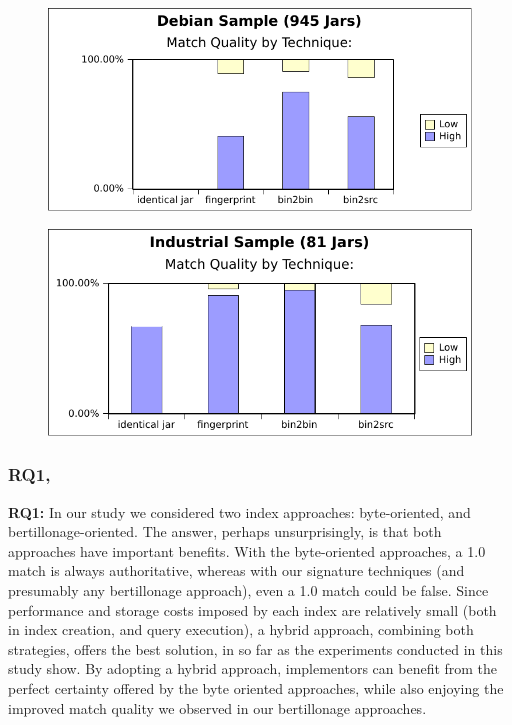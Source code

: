 \begin{figure}[ht]
\begin{minipage}[b]{0.5\linewidth}
\centering
\includegraphics[width=\columnwidth]{plots/debianMatchQuality.pdf}
\label{fig:debianMatchQual}
\end{minipage}
\hspace{0.5cm}
\begin{minipage}[b]{0.5\linewidth}
\centering
\includegraphics[width=\columnwidth]{plots/industryMatchQuality.pdf}
\label{fig:industryMatchQual}
\end{minipage}
\end{figure}



\subsubsection{RQ1, \rqOne}

\begin{hassanbox}
\textbf{RQ1:} In our study we considered two index approaches:  byte-oriented, and bertillonage-oriented.
The answer, perhaps unsurprisingly, is that both approaches have important benefits.
With the byte-oriented approaches, a 1.0 match is always authoritative, whereas with
our signature techniques (and presumably any bertillonage approach), even a 1.0 match could be false.
Since performance and storage costs imposed by each index are relatively small
(both in index creation, and query execution), a hybrid approach, combining both strategies,
offers the best solution, in so far as the experiments conducted in this study show.
By adopting a hybrid approach, implementors can benefit from the perfect certainty
offered by the byte oriented approaches, while also enjoying the improved match quality
we observed in our bertillonage approaches.
\end{hassanbox}



